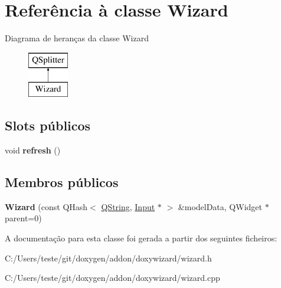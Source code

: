 \hypertarget{class_wizard}{\section{Referência à classe Wizard}
\label{class_wizard}
}
Diagrama de heranças da classe Wizard\begin{figure}[H]
\begin{center}
\leavevmode
\includegraphics[height=2.000000cm]{class_wizard}
\end{center}
\end{figure}
\subsection*{Slots públicos}
\begin{DoxyCompactItemize}
\item 
\hypertarget{class_wizard_a5f2e190b8261a98c97c2ea4e86670d54}{void {\bfseries refresh} ()}\label{class_wizard_a5f2e190b8261a98c97c2ea4e86670d54}

\end{DoxyCompactItemize}
\subsection*{Membros públicos}
\begin{DoxyCompactItemize}
\item 
\hypertarget{class_wizard_ab2bcca15fbfd320dc8ff534567c33433}{{\bfseries Wizard} (const Q\-Hash$<$ \hyperlink{class_q_string}{Q\-String}, \hyperlink{class_input}{Input} $\ast$ $>$ \&model\-Data, Q\-Widget $\ast$parent=0)}\label{class_wizard_ab2bcca15fbfd320dc8ff534567c33433}

\end{DoxyCompactItemize}


A documentação para esta classe foi gerada a partir dos seguintes ficheiros\-:\begin{DoxyCompactItemize}
\item 
C\-:/\-Users/teste/git/doxygen/addon/doxywizard/wizard.\-h\item 
C\-:/\-Users/teste/git/doxygen/addon/doxywizard/wizard.\-cpp\end{DoxyCompactItemize}

